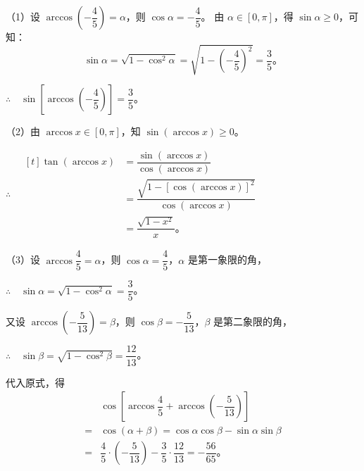 \jie （1）设 $\arccos\left( -\dfrac{4}{5} \right) = \alpha$，则 $\cos\alpha = -\dfrac{4}{5}$。
由 $\alpha \in [0, \pi]$，得 $\sin\alpha \geqslant 0$，可知：
$$\sin\alpha = \sqrt{1 - \cos^2\alpha} = \sqrt{1 - \left( -\dfrac{4}{5} \right)^2} = \dfrac{3}{5} \text{。}$$

$\therefore \quad \sin\left[ \arccos\left( -\dfrac{4}{5} \right)\right] = \dfrac{3}{5}$。

（2）由 $\arccos x \in [0, \pi]$，知 $\sin(\arccos x) \geqslant 0$。

$\therefore \quad
\begin{aligned}[t]
    \tan(\arccos x) &= \dfrac{\sin(\arccos x)}{\cos(\arccos x)} \\
        & = \dfrac{\sqrt{1 - [\cos(\arccos x)]^2}}{\cos(\arccos x)} \\
        & = \dfrac{\sqrt{1 - x^2}}{x} \text{。}
\end{aligned}$

（3）设 $\arccos \dfrac{4}{5} = \alpha$，则 $\cos\alpha = \dfrac{4}{5}$，$\alpha$ 是第一象限的角，

$\therefore \quad \sin\alpha = \sqrt{1 - \cos^2\alpha} = \dfrac{3}{5}$。

又设 $\arccos\left( -\dfrac{5}{13} \right) = \beta$，则 $\cos\beta = -\dfrac{5}{13}$，$\beta$ 是第二象限的角，

$\therefore \quad \sin\beta = \sqrt{1 - \cos^2\beta} = \dfrac{12}{13}$。

代入原式，得
\begin{align*}
    & \cos\left[ \arccos\dfrac{4}{5} + \arccos\left( -\dfrac{5}{13} \right)\right] \\
    = & \cos(\alpha + \beta) = \cos\alpha \cos\beta - \sin\alpha \sin\beta \\
    = & \dfrac{4}{5} \cdot \left( -\dfrac{5}{13} \right) - \dfrac{3}{5} \cdot \dfrac{12}{13} = -\dfrac{56}{65} \text{。}
\end{align*}

